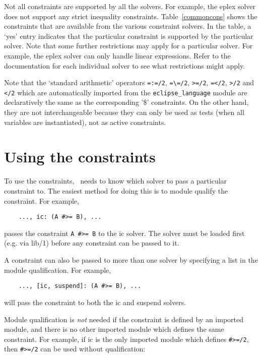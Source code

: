 Not all constraints are supported by all the solvers. For example, the
eplex solver does not support any strict inequality constraints.
Table~\ref{commoncons} shows the constraints that are available
from the various constraint solvers.
In the table, a `yes' entry indicates that the
particular constraint is supported by the particular solver. Note
that some further restrictions may apply for a particular solver. For
example, the eplex solver can only handle linear expressions. Refer
to the documentation for each individual solver to see what restrictions
might apply.

Note that the `standard arithmetic' operators
\verb'=:=/2', \verb'=\=/2', \verb'>=/2', \verb'=</2', \verb'>/2' and \verb'</2'
which are automatically imported from the {\tt eclipse_language} module
are declaratively the same as the corresponding '\$' constraints.
On the other hand, they are not interchangeable because they
can only be used as tests (when all variables are instantiated),
not as active constraints. 


\section{Using the constraints}

To use the constraints, \eclipse\ needs to know which solver to pass a
particular constraint to. The easiest method for doing this is to module
qualify the constraint. For example,

\begin{verbatim}
    ..., ic: (A #>= B), ...
\end{verbatim}

\noindent
passes the constraint \verb'A #>= B' to the ic solver. The solver must be
loaded first (e.g. via lib/1) before any constraint can be passed to it.

A constraint can also be passed to more than one solver by specifying a
list in the module qualification. For example,

\begin{verbatim}
    ..., [ic, suspend]: (A #>= B), ...
\end{verbatim}

\noindent
will pass the constraint to both the ic and suspend solvers. 

Module qualification is {\em not} needed if the constraint is defined by an
imported module, and there is no other imported module
which defines the same constraint. For example, if ic is the only imported
module which defines \verb'#>=/2', then \verb'#>=/2' can be used without 
qualification:

